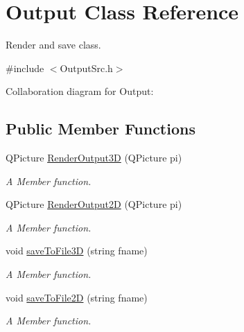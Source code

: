 \hypertarget{classOutput}{}\section{Output Class Reference}
\label{classOutput}


Render and save class.  




{\ttfamily \#include $<$Output\+Src.\+h$>$}



Collaboration diagram for Output\+:
\subsection*{Public Member Functions}
\begin{DoxyCompactItemize}
\item 
Q\+Picture \hyperlink{classOutput_aac99693b73661bf4af821aa5d32094ea}{Render\+Output3D} (Q\+Picture pi)
\begin{DoxyCompactList}\small\item\em A Member function. \end{DoxyCompactList}\item 
Q\+Picture \hyperlink{classOutput_aabbc20a5012e08ef1d242c2800ba8421}{Render\+Output2D} (Q\+Picture pi)
\begin{DoxyCompactList}\small\item\em A Member function. \end{DoxyCompactList}\item 
void \hyperlink{classOutput_a23f2365e8a4f60a0845de5e637266588}{save\+To\+File3D} (string fname)
\begin{DoxyCompactList}\small\item\em A Member function. \end{DoxyCompactList}\item 
void \hyperlink{classOutput_ae97e0cb97e7d7b5a8d2b044319a2f5b9}{save\+To\+File2D} (string fname)
\begin{DoxyCompactList}\small\item\em A Member function. \end{DoxyCompactList}\end{DoxyCompactItemize}

